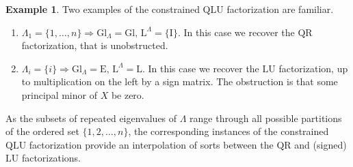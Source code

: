 \documentclass[reqno]{amsart}
\newcommand{\E}{\mathrm{E}}
\newcommand{\Gl}{\mathrm{Gl}}
\renewcommand{\L}{\mathrm{L}}
\newcommand{\U}{\mathrm{U}}
\theoremstyle{definition} %
\newtheorem{example}{Example}
\begin{document}
\begin{example}
Two examples  of the constrained $\mathrm{Q}\L\U$ factorization are familiar.
 \begin{enumerate}
  \item $\Lambda_1=\{1,\dots,n\}\Longrightarrow \Gl_\Lambda=\Gl,\,\L^\Lambda=\{\mathrm{I}\}$.\newline
  In this case we recover the $\mathrm{QR}$ factorization, that is unobstructed.
  \item $\Lambda_i=\{i\}\Longrightarrow \Gl_\Lambda=\E,\,\L^\Lambda=\L$.
  In this case we recover the $\L\U$ factorization, up to  multiplication on the left by a sign matrix. The obstruction is that some principal minor of $X$ be zero.
 \end{enumerate}

 As the subsets of repeated eigenvalues of $\Lambda$ range through all possible partitions of the ordered set $\{1,2,\dots,n\}$, the corresponding instances of the constrained $\mathrm{Q}\L\U$ factorization provide an interpolation of sorts between the  $\mathrm{QR}$ and (signed) $\L\U$ factorizations.
\end{example}
\end{document}
